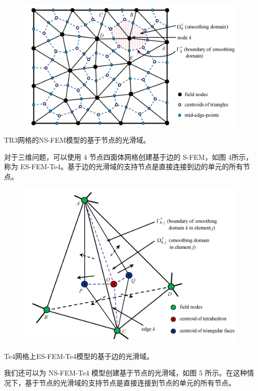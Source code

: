 \documentclass[12pt,a4paper]{article}
\begin{document}
\begin{figure}[H]
\centering
\includegraphics[scale=0.5]{./figures/3.png}
\caption{}
\end{figure}

TR3网格的NS-FEM模型的基于节点的光滑域。

对于三维问题，可以使用 4 节点四面体网格创建基于边的 S-FEM，如图 4所示，称为 ES-FEM-Te4。基于边的光滑域的支持节点是直接连接到边的单元的所有节点。

\begin{figure}[H]
\centering
\includegraphics[scale=0.5]{./figures/4.png}
\caption{}
\end{figure}

Te4网格上ES-FEM-Te4模型的基于边的光滑域。

我们还可以为 NS-FEM-Te4 模型创建基于节点的光滑域，如图 5 所示。在这种情况下，基于节点的光滑域的支持节点是直接连接到节点的单元的所有节点。
\end{document}
